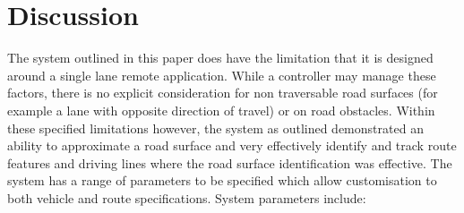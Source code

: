 \documentclass[]{aiaa-tc}%
\begin{document}
\section{Discussion} \label{s:discussion}

The system outlined in this paper does have the limitation that it is designed around a single lane remote application. While a controller may manage these factors, there is no explicit consideration for non traversable road surfaces (for example a lane with opposite direction of travel) or on road obstacles. Within these specified limitations however, the system as outlined demonstrated an ability to approximate a road surface and very effectively identify and track route features and driving lines where the road surface identification was effective. The system has a range of parameters to be specified which allow customisation to both vehicle and route specifications. System parameters include: 
\end{document}
